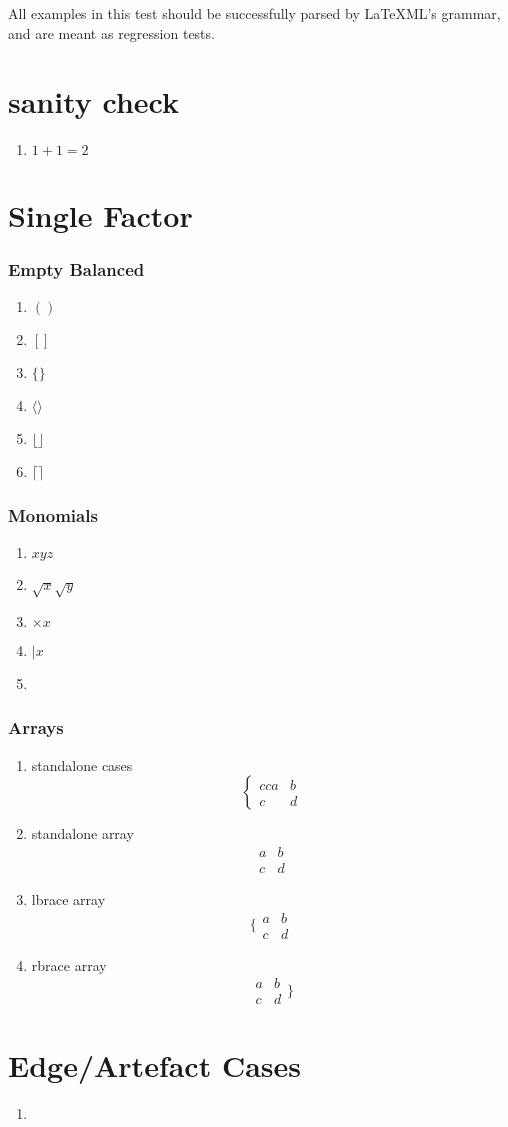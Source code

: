 \documentclass{article}
\def\mockarray{\begin{array}{cc} 
  a & b \\
  c & d 
  \end{array}}
\def\mockcases{\begin{cases}{cc} 
    a & b \\
    c & d 
    \end{cases}}
\begin{document}
All examples in this test should be successfully parsed by LaTeXML's grammar, and are meant as regression tests.

\section{sanity check}
\begin{enumerate}
\item $1+1=2$
\end{enumerate}

\section{Single Factor}
\subsubsection{Empty Balanced}
\begin{enumerate}
  \item $()$
  \item $[]$
  \item $\{\}$
  \item $\langle\rangle$
  \item $\lfloor\rfloor$
  \item $\lceil\rceil$
\end{enumerate}

\subsubsection{Monomials}
\begin{enumerate}
  \item $xyz$
  \item $\sqrt{x}\sqrt{y}$
  \item $\times x$ %
  \item $\mathbin{|} x$ %
  \item 
\end{enumerate}

\subsubsection{Arrays}
\begin{enumerate}
  \item standalone cases 
  $$\mockcases$$
  
  \item standalone array
  $$\mockarray$$
  
  \item lbrace array 
  $$\{ \mockarray$$
  
  \item rbrace array 
  $$\mockarray \}$$

\end{enumerate}

\section{Edge/Artefact Cases}
\begin{enumerate}
  \item $\,$  %
\end{enumerate}
\end{document}
